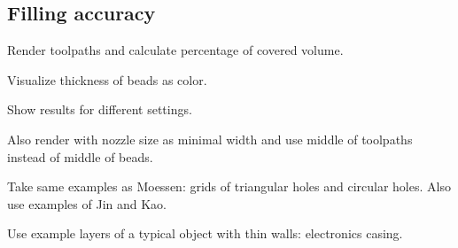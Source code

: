 \subsection{Filling accuracy}
Render toolpaths and calculate percentage of covered volume.

Visualize thickness of beads as color.

Show results for different settings.

Also render with nozzle size as minimal width and use middle of toolpaths instead of middle of beads.

Take same examples as Moessen: grids of triangular holes and circular holes.
Also use examples of Jin and Kao.

Use example layers of a typical object with thin walls: electronics casing.


